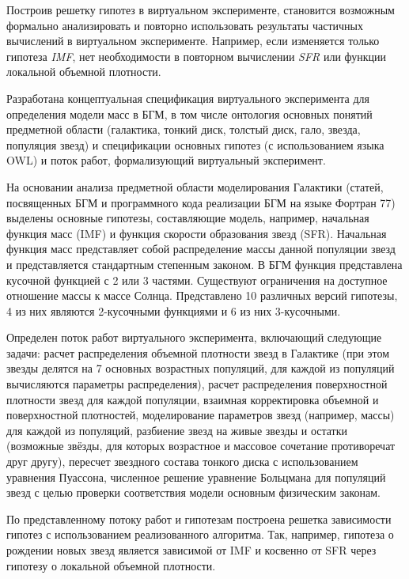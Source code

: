 Построив решетку гипотез в виртуальном эксперименте, становится возможным формально анализировать и повторно 
использовать результаты частичных вычислений в виртуальном эксперименте. Например, если изменяется только 
гипотеза \textit{IMF}, нет необходимости в повторном вычислении \textit{SFR} или функции локальной объемной плотности.

Разработана концептуальная спецификация виртуального эксперимента для определения модели масс в БГМ, в том 
числе онтология основных понятий предметной области (галактика, тонкий диск, толстый диск, гало, звезда, 
популяция звезд) и спецификации основных гипотез (с использованием языка OWL) и поток работ, формализующий 
виртуальный эксперимент.

На основании анализа предметной области моделирования Галактики (статей, посвященных БГМ и программного 
кода реализации БГМ на языке Фортран 77) выделены основные гипотезы, составляющие модель, например, 
начальная функция масс (IMF) и функция скорости образования звезд (SFR). Начальная функция масс представляет 
собой распределение массы данной популяции звезд и представляется стандартным степенным законом. 
В БГМ функция представлена кусочной функцией с 2 или 3 частями. Существуют ограничения на доступное 
отношение массы к массе Солнца. Представлено 10 различных версий гипотезы, 4 из них являются 2-кусочными 
функциями и 6 из них 3-кусочными.

Определен поток работ виртуального эксперимента, включающий следующие задачи: расчет распределения объемной 
плотности звезд в Галактике (при этом звезды делятся на 7 основных возрастных популяций, для каждой из 
популяций вычисляются параметры распределения), расчет распределения поверхностной плотности звезд для каждой 
популяции, взаимная корректировка объемной и поверхностной плотностей, моделирование параметров звезд 
(например, массы) для каждой из популяций, разбиение звезд на живые звезды и остатки (возможные звёзды, для 
которых возрастное и массовое сочетание противоречат друг другу), пересчет звездного состава тонкого диска с 
использованием уравнения Пуассона, численное решение уравнение Больцмана для популяций звезд с целью проверки 
соответствия модели основным физическим законам.

По представленному потоку работ и гипотезам построена решетка зависимости гипотез с использованием реализованного 
алгоритма. Так, например, гипотеза о рождении новых звезд является зависимой от IMF и косвенно 
от SFR через гипотезу о локальной объемной плотности.

